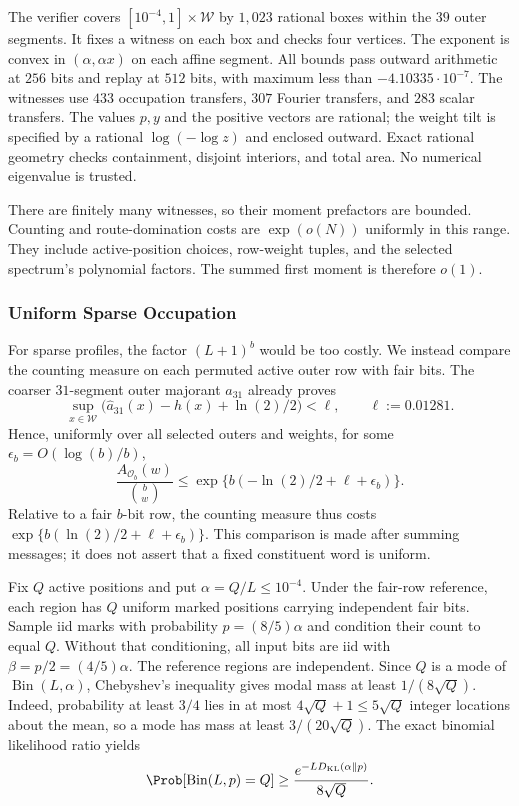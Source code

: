 The verifier covers $[10^{-4},1]\times\mathcal W$ by $1{,}023$ rational
boxes within the $39$ outer segments. It fixes a witness on each box and
checks four vertices. The exponent is convex in $(\alpha,\alpha x)$ on
each affine segment. All bounds pass outward arithmetic at $256$ bits and
replay at $512$ bits, with maximum less than $-4.10335\cdot10^{-7}$.
The witnesses use $433$ occupation transfers, $307$ Fourier transfers, and
$283$ scalar transfers. The values $p,y$ and the positive vectors are rational;
the weight tilt is specified by a rational $\log(-\log z)$ and enclosed
outward. Exact rational geometry checks containment, disjoint interiors,
and total area. No numerical eigenvalue is trusted.

There are finitely many witnesses, so their moment prefactors are bounded.
Counting and route-domination costs are $\exp(o(N))$ uniformly in this range.
They include active-position choices, row-weight tuples, and the selected
spectrum's polynomial factors. The summed first moment is therefore $o(1)$.

\subsubsection{Uniform Sparse Occupation}
\label{app:imt-sparse}

For sparse profiles, the factor $(L+1)^b$ would be too costly. We instead
compare the counting measure on each permuted active outer row with fair
bits. The coarser $31$-segment outer majorant $\widehat a_{31}$ already proves
\[
 \sup_{x\in\mathcal W}\bigl(\widehat a_{31}(x)-h(x)+\ln(2)/2\bigr)
 <\ell,\qquad \ell:=0.01281.
\]
Hence, uniformly over all selected outers and weights, for some
$\epsilon_b=O(\log(b)/b)$,
\begin{equation}
 \frac{A_{\mathcal O_b}(w)}{\binom bw}
 \le \exp\{b(-\ln(2)/2+\ell+\epsilon_b)\}.
 \label{eq:imt-row-likelihood}
\end{equation}
Relative to a fair $b$-bit row, the counting measure thus costs
$\exp\{b(\ln(2)/2+\ell+\epsilon_b)\}$. This comparison is made after
summing messages; it does not assert that a fixed constituent word is uniform.

Fix $Q$ active positions and put $\alpha=Q/L\le10^{-4}$.
Under the fair-row reference, each region has $Q$ uniform marked positions
carrying independent fair bits. Sample iid marks with probability
$p=(8/5)\alpha$ and condition their count to equal $Q$. Without that
conditioning, all input bits are iid with $\beta=p/2=(4/5)\alpha$.
The reference regions are independent. Since $Q$ is a mode of
$\operatorname{Bin}(L,\alpha)$, Chebyshev's inequality gives modal mass
at least $1/(8\sqrt Q)$. Indeed, probability at least $3/4$ lies in at most
$4\sqrt Q+1\le5\sqrt Q$ integer locations about the mean, so a mode has mass
at least $3/(20\sqrt Q)$. The exact binomial likelihood ratio yields
\[
 \Prob[\operatorname{Bin}(L,p)=Q]
 \ge \frac{e^{-LD_{\rm KL}(\alpha\Vert p)}}{8\sqrt Q}.
\]

